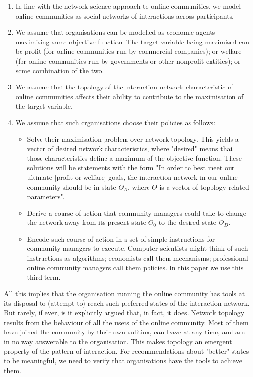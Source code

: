 \begin{enumerate}
\item In line with the network science approach to online communities, we model online communities as social networks of interactions across participants. 
\item We assume that organisations can be modelled as economic agents maximising some objective function. The target variable being maximised can be profit (for online communities run by commercial companies); or welfare (for online communities run by governments or other nonprofit entities); or some combination of the two. 
\item We assume that the topology of the interaction network characteristic of online communities affects their ability to contribute to the maximisation of the target variable. 
\item We assume that such organisations choose their policies as follows: 
\begin{itemize} 
	\item Solve their maximisation problem over network topology. This yields a vector of desired network characteristics, where "desired" means that those characteristics define a maximum of the objective function. These solutions will be statements with the form "In order to best meet our ultimate [profit or welfare] goals, the interaction network in our online community should be in state $\Theta_D$, where $\Theta$ is a vector of topology-related parameters".
	\item Derive a course of action that community managers could take to change the network away from its present state $\Theta_0$ to the desired state $\Theta_D$.
	\item Encode such course of action in a set of simple instructions for community managers to execute. Computer scientists might think of such instructions as algorithms; economists call them mechanisms; professional online community managers call them policies. In this paper we use this third term. 
\end{itemize}
\end{enumerate}

All this implies that the organisation running the online community has tools at its disposal to (attempt to) reach such preferred states of the interaction network. But rarely, if ever, is it explicitly argued that, in fact, it does. Network topology results from the behaviour of all the users of the online community. Most of them have joined the community by their own volition, can leave at any time, and are in no way answerable to the organisation. This makes topology an emergent property of the pattern of interaction. For recommendations about "better" states to be meaningful, we need to verify that organisations have the tools to achieve them. 

